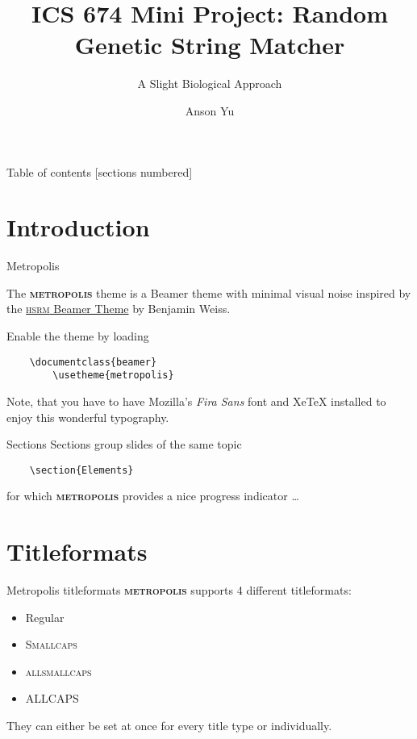 \documentclass[10pt]{beamer}
\title{ICS 674 Mini Project: Random Genetic String Matcher}
\subtitle{A Slight Biological Approach}
\date{}
\author{Anson Yu}
\institute{Universtiy of Hawaii at Manoa}
\newcommand{\themename}{\textbf{\textsc{metropolis}}\xspace}
\begin{document}
    
    \maketitle
    
\begin{frame}{Table of contents}
      [sections numbered]
      \tableofcontents[hideallsubsections]
\end{frame}
    
    \section{Introduction}
    
\begin{frame}[fragile]{Metropolis}
    
      The \themename theme is a Beamer theme with minimal visual noise
      inspired by the \href{https://github.com/hsrmbeamertheme/hsrmbeamertheme}{\textsc{hsrm} Beamer
      Theme} by Benjamin Weiss.
    
      Enable the theme by loading
    
\begin{verbatim}    \documentclass{beamer}
        \usetheme{metropolis}\end{verbatim}
    
      Note, that you have to have Mozilla's \emph{Fira Sans} font and XeTeX
      installed to enjoy this wonderful typography.
\end{frame}
    \begin{frame}[fragile]{Sections}
      Sections group slides of the same topic
    
      \begin{verbatim}    \section{Elements}\end{verbatim}
    
      for which \themename provides a nice progress indicator \ldots
\end{frame}
    
    \section{Titleformats}
    
\begin{frame}{Metropolis titleformats}
        \themename supports 4 different titleformats:
        \begin{itemize}
            \item Regular
            \item \textsc{Smallcaps}
            \item \textsc{allsmallcaps}
            \item ALLCAPS
        \end{itemize}
        They can either be set at once for every title type or individually.
\end{frame}
    
\end{document}
